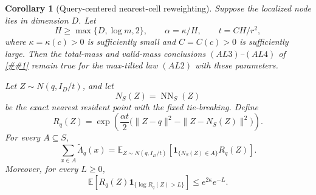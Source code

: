 \documentclass[10pt]{article}
\newcommand{\cref}[1]{\ref{##1}}
\newtheorem{corollary}[theorem]{Corollary}
\theoremstyle{definition}
\newcommand{\E}{\mathbb{E}}
\begin{document}
\begin{corollary}[Query-centered nearest-cell reweighting]
   \label{cor:query-centered-cell-reweighting}
   Suppose the localized node lies in dimension \(D\).  Let
   \[
      H\ge\max\{D,\log m,2\},\qquad
      \alpha=\kappa/H,\qquad
      t=C H/r^2 ,
      \tag{QC0}
   \]
   where \(\kappa=\kappa(c)>0\) is sufficiently small and
   \(C=C(c)>0\) is sufficiently large.  Then the total-mass and valid-mass
   conclusions \((AL3)\)--\((AL4)\) of
   \cref{lem:scale-amplified-alpha-leader} remain true for the max-tilted law
   \((AL2)\) with these parameters.

   Let \(Z\sim N(q,I_D/t)\), and let
   \[
      N_S(Z)=\operatorname{NN}_S(Z)
   \]
   be the exact nearest resident point with the fixed tie-breaking.  Define
   \[
      R_q(Z)
      =
      \exp\!\left(
         \frac{\alpha t}{2}
         \bigl(\|Z-q\|^2-\|Z-N_S(Z)\|^2\bigr)
      \right).
      \tag{QC1}
   \]
   For every \(A\subseteq S\),
   \[
      \sum_{x\in A}\widetilde\Lambda_q(x)
      =
      \E_{Z\sim N(q,I_D/t)}
      \left[
         \mathbf 1_{\{N_S(Z)\in A\}}R_q(Z)
      \right].
      \tag{QC2}
   \]
   Moreover, for every \(L\ge0\),
   \[
      \E\left[
         R_q(Z)\mathbf 1_{\{\log R_q(Z)>L\}}
      \right]
      \le
      e^{2\kappa}e^{-L}.
      \tag{QC3}
   \]
\end{corollary}
\end{document}
